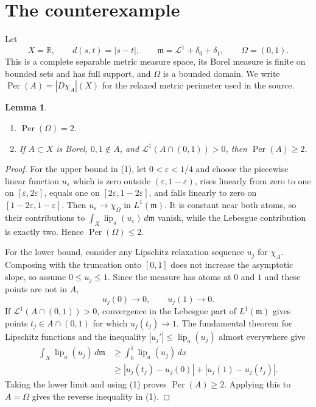 \documentclass[11pt]{article}
\newtheorem{lemma}[theorem]{Lemma}
\newcommand{\Per}{\operatorname{Per}}
\newcommand{\Leb}{\mathcal L^1}
\newcommand{\lip}{\operatorname{lip}_a}
\begin{document}
\section{The counterexample}

Let
\[
 X=\mathbb R,\qquad d(s,t)=|s-t|,\qquad
 \mathfrak m=\Leb+\delta_0+\delta_1,
 \qquad \Omega=(0,1).
\]
This is a complete separable metric measure space, its Borel measure is finite
on bounded sets and has full support, and $\Omega$ is a bounded domain.  We
write $\Per(A)=|D\chi_A|(X)$ for the relaxed metric perimeter used in the
source.

\begin{lemma}\label{lem:perimeter}
\begin{enumerate}
\item $\Per(\Omega)=2$.
\item If $A\subset X$ is Borel, $0,1\notin A$, and
      $\Leb(A\cap(0,1))>0$, then $\Per(A)\ge2$.
\end{enumerate}
\end{lemma}

\begin{proof}
For the upper bound in (1), let $0<\varepsilon<1/4$ and choose the piecewise
linear function $u_\varepsilon$ which is zero outside
$(\varepsilon,1-\varepsilon)$, rises linearly from zero to one on
$[\varepsilon,2\varepsilon]$, equals one on
$[2\varepsilon,1-2\varepsilon]$, and falls linearly to zero on
$[1-2\varepsilon,1-\varepsilon]$.  Then
$u_\varepsilon\to\chi_\Omega$ in $L^1(\mathfrak m)$.  It is constant near
both atoms, so their contributions to
$\int_X\lip(u_\varepsilon)\,d\mathfrak m$ vanish, while the Lebesgue
contribution is exactly two.  Hence $\Per(\Omega)\le2$.

For the lower bound, consider any Lipschitz relaxation sequence $u_j$ for
$\chi_A$.  Composing with the truncation onto $[0,1]$ does not increase the
asymptotic slope, so assume $0\le u_j\le1$.  Since the measure has atoms at
$0$ and $1$ and these points are not in $A$,
\[
 u_j(0)\longrightarrow0,\qquad u_j(1)\longrightarrow0.
 \tag{1}
\]
If $\Leb(A\cap(0,1))>0$, convergence in the Lebesgue part of
$L^1(\mathfrak m)$ gives points $t_j\in A\cap(0,1)$ for which
$u_j(t_j)\to1$.  The fundamental theorem for Lipschitz functions and the
inequality $|u_j'|\le\lip(u_j)$ almost everywhere give
\begin{align*}
 \int_X\lip(u_j)\,d\mathfrak m
 &\ge \int_0^1\lip(u_j)\,dx\\
 &\ge |u_j(t_j)-u_j(0)|+|u_j(1)-u_j(t_j)|.
\end{align*}
Taking the lower limit and using (1) proves $\Per(A)\ge2$.  Applying this to
$A=\Omega$ gives the reverse inequality in (1).
\end{proof}
\end{document}
